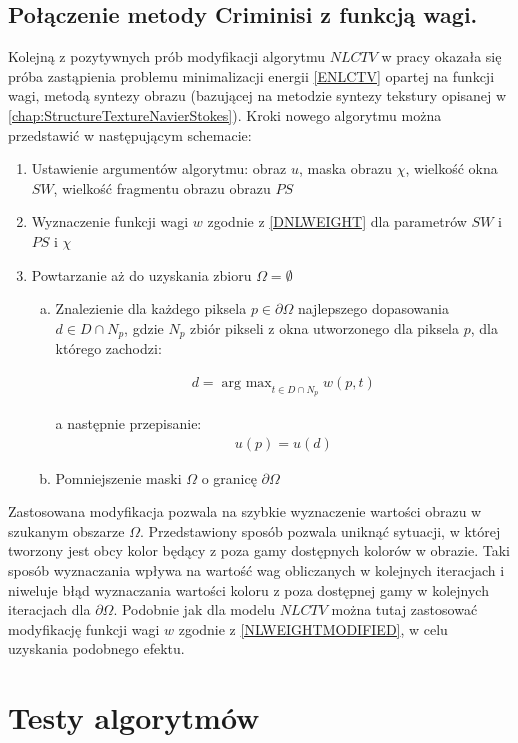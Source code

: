 \documentclass[12pt, twoside, openany]{report}
\theoremstyle{definition}
\begin{document}
\section{Połączenie metody Criminisi z funkcją wagi.}
Kolejną z pozytywnych prób modyfikacji algorytmu $NLCTV$ w pracy okazała się próba zastąpienia problemu minimalizacji energii \eqref{ENLCTV} opartej na funkcji wagi, metodą syntezy obrazu (bazującej na metodzie syntezy tekstury opisanej w \autoref{chap:StructureTextureNavierStokes}). Kroki nowego algorytmu można przedstawić w następującym schemacie:
\begin{enumerate}
\item
Ustawienie argumentów algorytmu: obraz $u$, maska obrazu $\chi$, wielkość okna $SW$, wielkość fragmentu obrazu obrazu $PS$ 
\item
Wyznaczenie funkcji wagi $w$ zgodnie z \eqref{DNLWEIGHT} dla parametrów $SW$ i $PS$ i $\chi$
\item
Powtarzanie aż do uzyskania zbioru $\Omega = \emptyset$
\begin{enumerate}[a)]
\item
Znalezienie dla każdego piksela $p \in \partial\Omega$ najlepszego dopasowania $d \in D \cap N_p$, gdzie $N_p$ zbiór pikseli z okna utworzonego dla piksela $p$, dla którego zachodzi:
\begin{large}
\begin{align}
d = \mathop{\mathrm{arg \ max}}_{t \in D \cap N_p} w(p,t)
\end{align}
\end{large}
a następnie przepisanie:
\begin{align}
u(p) = u(d)
\end{align}
\item
Pomniejszenie maski $\Omega$ o granicę $\partial\Omega$
\end{enumerate}
\end{enumerate}
Zastosowana modyfikacja pozwala na szybkie wyznaczenie wartości obrazu w szukanym obszarze $\Omega$. Przedstawiony sposób  pozwala uniknąć sytuacji, w której tworzony jest obcy kolor będący z poza gamy dostępnych kolorów w obrazie. Taki sposób wyznaczania wpływa na wartość wag obliczanych w kolejnych iteracjach i niweluje błąd wyznaczania wartości koloru z poza dostępnej gamy w kolejnych iteracjach dla $\partial \Omega$. Podobnie jak dla modelu $NLCTV$ można tutaj  zastosować modyfikację funkcji wagi $w$ zgodnie z \eqref{NLWEIGHTMODIFIED}, w celu uzyskania podobnego efektu.
\chapter{Testy algorytmów}
\end{document}
